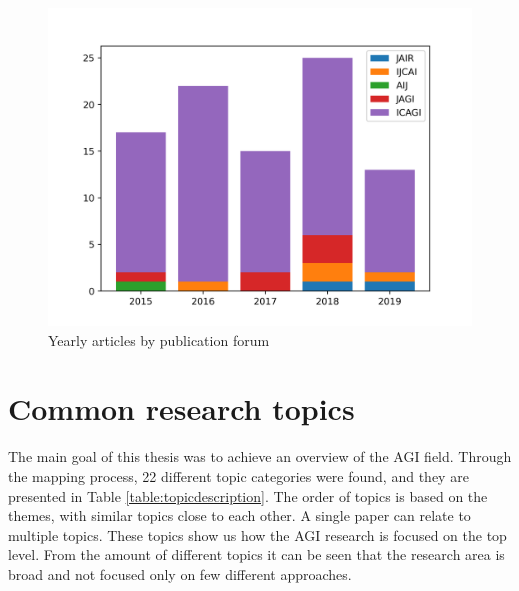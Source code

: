 \documentclass[utf8,english]{gradu3}
\begin{document}
\begin{figure}[H]
  \centering
  \includegraphics[scale=0.60]{material/data/yearly_publications.png}
  \caption{Yearly articles by publication forum}
  \label{fig:yearlybar}
\end{figure}

\section{Common research topics}

The main goal of this thesis was to achieve an overview of the AGI field.
Through the mapping process, 22 different topic categories were found, and they
are presented in Table \ref{table:topicdescription}. The order of topics is
based on the themes, with similar topics close to each other. A single paper can
relate to multiple topics. These topics show us how the AGI research is focused
on the top level. From the amount of different topics it can be seen that the
research area is broad and not focused only on few different approaches. 
\end{document}

